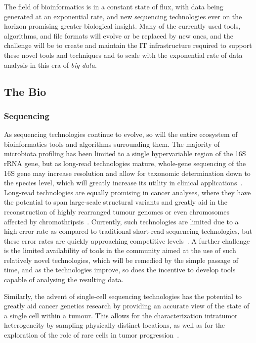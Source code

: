 The field of bioinformatics is in a constant state of flux, with data being generated at an exponential rate, and new sequencing technologies ever on the horizon promising greater biological insight. Many of the currently used tools, algorithms, and file formats will evolve or be replaced by new ones, and the challenge will be to create and maintain the IT infrastructure required to support these novel tools and techniques and to scale with the exponential rate of data analysis in this era of \emph{big data}.

\subsection{The Bio}

\subsubsection{Sequencing}
As sequencing technologies continue to evolve, so will the entire ecosystem of bioinformatics tools and algorithms surrounding them.
The majority of microbiota profiling has been limited to a single hypervariable region of the 16S rRNA gene, but as long-read technologies mature, whole-gene sequencing of the 16S gene may increase resolution and allow for taxonomic determination down to the species level, which will greatly increase its utility in clinical applications~\cite{toma2014single,franzen2015improved}.
Long-read technologies are equally promising in cancer analyses, where they have the potential to span large-scale structural variants and greatly aid in the reconstruction of highly rearranged tumour genomes or even chromosomes affected by chromothripsis~\cite{norris2016nanopore,nattestad2018complex}.
Currently, such technologies are limited due to a high error rate as compared to traditional short-read sequencing technologies, but these error rates are quickly approaching competitive levels~\cite{kraft2019long}.
A further challenge is the limited availability of tools in the community aimed at the use of such relatively novel technologies, which will be remedied by the simple passage of time, and as the technologies improve, so does the incentive to develop tools capable of analysing the resulting data.

Similarly, the advent of single-cell sequencing technologies has the potential to greatly aid cancer genetics research by providing an accurate view of the state of a single cell within a tumour. This allows for the characterization intratumor heterogeneity by sampling physically distinct locations, as well as for the exploration of the role of rare cells in tumor progression~\cite{navin2015first}.


